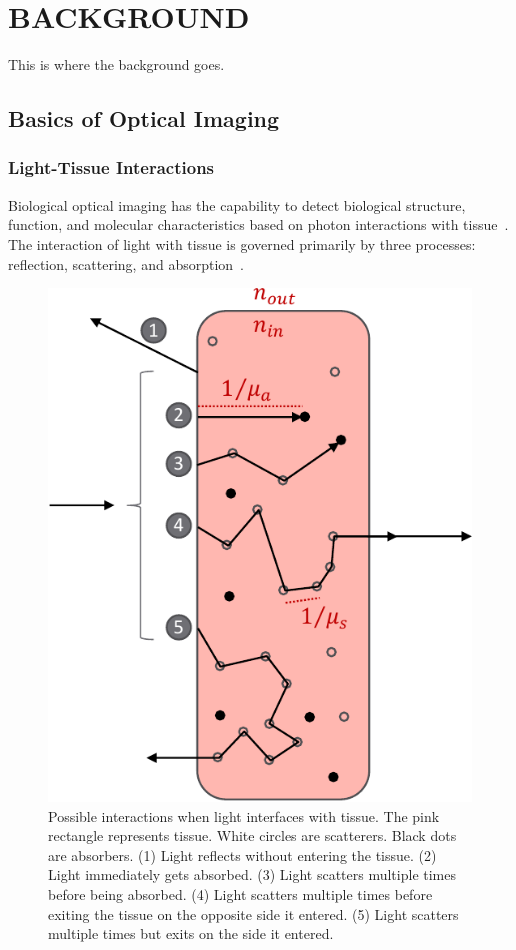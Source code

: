 
\chapter{BACKGROUND} %
\label{chap:background}
This is where the background goes. 



\section{Basics of Optical Imaging}
\label{chap:background:basics}

\subsection{Light-Tissue Interactions}
Biological optical imaging has the capability to detect biological structure, function, and molecular characteristics based on photon interactions with tissue~\cite{Wang2009}. The interaction of light with tissue is governed primarily by three processes: reflection, scattering, and absorption~\cite{Welch2010}.

\begin{figure}
    \begin{center}
    \includegraphics[width=.35\textwidth]{fig/background/lightinteraction.pdf}
    \end{center}
    \caption{Possible interactions when light interfaces with tissue. The pink rectangle represents tissue. White circles are scatterers. Black dots are absorbers.  (1) Light reflects without entering the tissue. (2) Light immediately gets absorbed. (3) Light scatters multiple times before being absorbed. (4) Light scatters multiple times before exiting the tissue on the opposite side it entered. (5) Light scatters multiple times but exits on the side it entered. } 
    \label{fig:lightinteraction}
\end{figure} 

